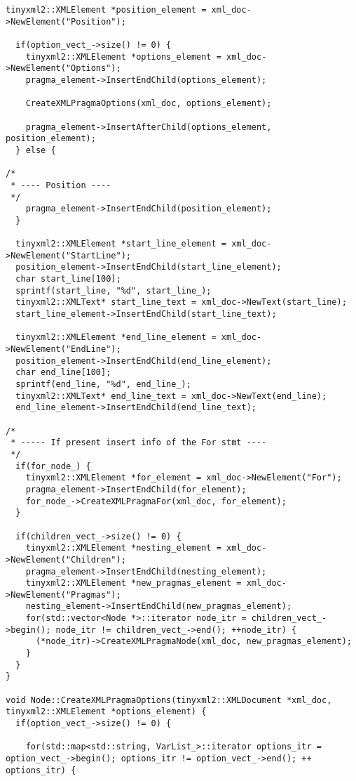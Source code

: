 \documentclass[a4paper,11pt,twoside]{book}
\begin{document}
\begin{lstlisting}[language=CCC, caption=pragma\_handler/Node.cpp]
  tinyxml2::XMLElement *position_element = xml_doc->NewElement("Position");
  
  if(option_vect_->size() != 0) {
    tinyxml2::XMLElement *options_element = xml_doc->NewElement("Options");
    pragma_element->InsertEndChild(options_element);

    CreateXMLPragmaOptions(xml_doc, options_element);

    pragma_element->InsertAfterChild(options_element, position_element);
  } else {

/*
 * ---- Position ----
 */  
    pragma_element->InsertEndChild(position_element);
  }

  tinyxml2::XMLElement *start_line_element = xml_doc->NewElement("StartLine");
  position_element->InsertEndChild(start_line_element);
  char start_line[100];
  sprintf(start_line, "%d", start_line_);
  tinyxml2::XMLText* start_line_text = xml_doc->NewText(start_line);
  start_line_element->InsertEndChild(start_line_text);

  tinyxml2::XMLElement *end_line_element = xml_doc->NewElement("EndLine");
  position_element->InsertEndChild(end_line_element);
  char end_line[100];
  sprintf(end_line, "%d", end_line_);
  tinyxml2::XMLText* end_line_text = xml_doc->NewText(end_line);
  end_line_element->InsertEndChild(end_line_text);

/*
 * ----- If present insert info of the For stmt ---- 
 */
  if(for_node_) {
    tinyxml2::XMLElement *for_element = xml_doc->NewElement("For");
    pragma_element->InsertEndChild(for_element);
    for_node_->CreateXMLPragmaFor(xml_doc, for_element);
  }

  if(children_vect_->size() != 0) {
    tinyxml2::XMLElement *nesting_element = xml_doc->NewElement("Children");
    pragma_element->InsertEndChild(nesting_element);
    tinyxml2::XMLElement *new_pragmas_element = xml_doc->NewElement("Pragmas");
    nesting_element->InsertEndChild(new_pragmas_element);
    for(std::vector<Node *>::iterator node_itr = children_vect_->begin(); node_itr != children_vect_->end(); ++node_itr) {
      (*node_itr)->CreateXMLPragmaNode(xml_doc, new_pragmas_element);
    }
  }
}

void Node::CreateXMLPragmaOptions(tinyxml2::XMLDocument *xml_doc, tinyxml2::XMLElement *options_element) {
  if(option_vect_->size() != 0) {
    
    for(std::map<std::string, VarList_>::iterator options_itr = option_vect_->begin(); options_itr != option_vect_->end(); ++ options_itr) {


\end{lstlisting}
\end{document}
